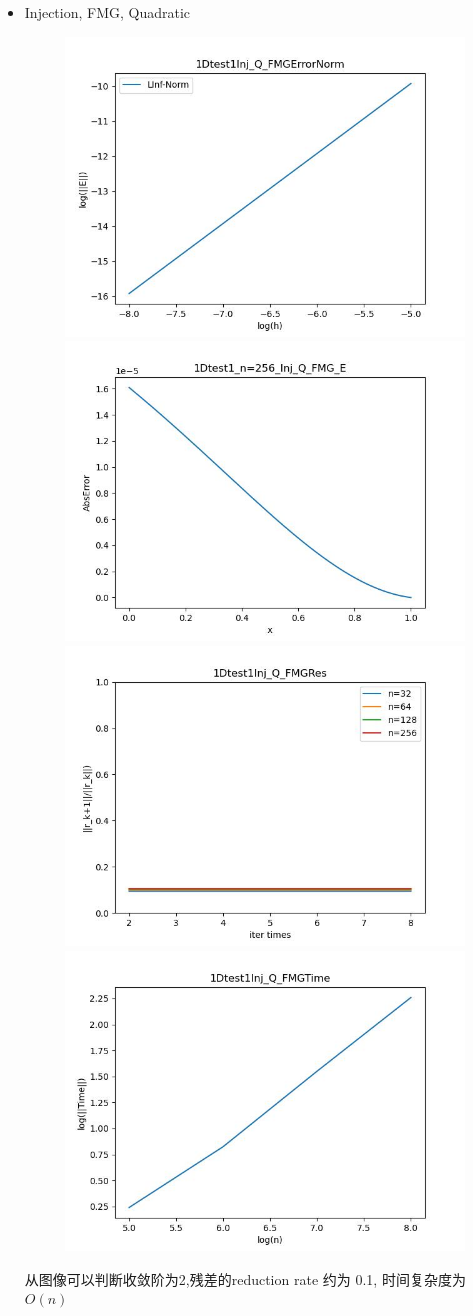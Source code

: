 \documentclass{article}
\begin{document}
\begin{itemize}
    \item Injection, FMG, Quadratic
    \begin{figure}[h]
        \centering
        \includegraphics[width=0.35\linewidth]{1Dtest1Inj_Q_FMGErrorNorm.jpg}
        \includegraphics[width=0.35\linewidth]{1Dtest1_n=256_Inj_Q_FMG_E.jpg}
        \includegraphics[width=0.35\linewidth]{1Dtest1Inj_Q_FMGRes.jpg}
        \includegraphics[width=0.35\linewidth]{1Dtest1Inj_Q_FMGTime.jpg}
    \end{figure}
    
    从图像可以判断收敛阶为2,残差的reduction rate 约为 0.1, 时间复杂度为$O(n)$
    \newpage


\end{itemize}
\end{document}
